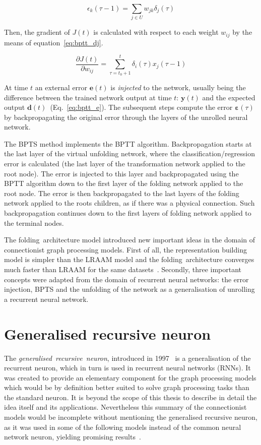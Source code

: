 \begin{equation}
\epsilon_k(\tau - 1) = \sum_{j \in U} w_{jk} \delta_j(\tau)
\label{eq:bptt_summaric}
\end{equation}

\noindent Then, the gradient of $J(t)$ is calculated with respect to each weight $w_{ij}$ by the means of equation~\ref{eq:bptt_dj}.

\begin{equation}
\frac{\partial J(t)}{\partial w_{ij}} = \sum_{\tau = t_0 + 1}^{t} \delta_i(\tau) x_j(\tau - 1)
\label{eq:bptt_dj}
\end{equation}

\noindent At time $t$ an external error $\bm{e}(t)$ is \emph{injected} to the network, usually being the difference between the trained network output at time $t$: $\bm{y}(t)$ and the expected output $\bm{d}(t)$~(Eq.~\ref{eq:bptt_e}). The subsequent steps compute the error $\bm{\varepsilon}(\tau)$ by backpropagating the original error through the layers of the unrolled neural network.

The BPTS method implements the BPTT algorithm. Backpropagation starts at the last layer of the virtual unfolding network, where the classification/regression error is calculated (the last layer of the transformation network applied to the root node). The error is injected to this layer and backpropagated using the BPTT algorithm down to the first layer of the folding network applied to the root node. The error is then backpropagated to the last layers of the folding network applied to the roots children, as if there was a physical connection. Such backpropagation continues down to the first layers of folding network applied to the terminal nodes.

The folding~architecture model introduced new important ideas in the domain of connectionist graph processing models. First of all, the representation building model is simpler than the LRAAM model and the folding~architecture converges much faster than LRAAM for the same datasets~\cite{goller1996learning}. Secondly, three important concepts were adapted from the domain of recurrent neural networks: the error injection, BPTS and the unfolding of the network as a generalisation of unrolling a recurrent neural network.

\section{Generalised recursive neuron}
The \emph{generalised~recursive~neuron}, introduced in 1997~\cite{sperduti1997supervised} is a generalisation of the recurrent neuron, which in turn is used in recurrent neural networks (RNNs). It was created to provide an elementary component for the graph processing models which would be by definition better suited to solve graph processing tasks than the standard neuron. It is beyond the scope of this thesis to describe in detail the idea itself and its applications. Nevertheless this summary of the connectionist models would be incomplete without mentioning the generalised recursive neuron, as it was used in some of the following models instead of the common neural network neuron, yielding promising results~\cite{frasconi1998general}.

